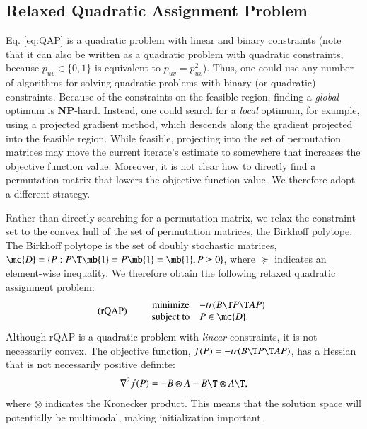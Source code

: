 \documentclass[preprint,11pt]{elsarticle}
\begin{document}
\subsection{Relaxed Quadratic Assignment Problem}

Eq. \ref{eq:QAP} is a quadratic problem with linear and binary constraints (note that it can also be written as a quadratic problem with quadratic constraints, because $p_{uv} \in \{0,1\}$ is equivalent to $p_{uv}=p_{uv}^2$).  Thus, one could use any number of algorithms for solving quadratic problems with binary (or quadratic) constraints.  Because of the constraints on the feasible region, finding a \emph{global} optimum is \textbf{NP}-hard.  Instead, one could search for a \emph{local} optimum, for example, using a projected gradient method, which descends along the gradient projected into the feasible region.  While feasible, projecting into the set of permutation matrices may move the current iterate's estimate to somewhere that increases the objective function value.  Moreover, it is not clear how to directly find a permutation matrix that lowers the objective function value.  We therefore adopt a different strategy.

Rather than directly searching for a permutation matrix, we relax the constraint set to the convex hull of the set of permutation matrices, the Birkhoff polytope.  The Birkhoff polytope is the set of doubly stochastic matrices, $\mc{D}=\{P : P\T \mb{1} =  P \mb{1} = \mb{1}, P \succeq 0\}$, where $\succeq$ indicates an element-wise inequality. We therefore obtain the following relaxed quadratic assignment problem:
\begin{equation}
\text{(rQAP)} \qquad  
\begin{array}{cl}
			\text{minimize}   & -tr(B\T P\T AP) \\
			\text{subject to}  &P \in \mc{D}.   
\end{array}\label{eq:rQAP}
\end{equation}
Although rQAP is a quadratic problem with \emph{linear} constraints, it is not necessarily convex.  The objective function, $f(P)=- tr(B\T P\T AP)$, has a Hessian that is not necessarily positive definite:
\begin{align*}
	\nabla^2 f(P)  =  - B \otimes A - B\T \otimes A\T,
\end{align*}
where $\otimes$ indicates the Kronecker product. This means that the solution space will potentially be multimodal, making initialization important.  
\end{document}
